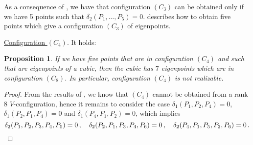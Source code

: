 \documentclass{amsart}
\theoremstyle{plain}
\newtheorem{prop}[lemma]{Proposition}
\theoremstyle{definition}
\begin{document}
As a consequence of , we have that configuration $(C_3)$ can
be obtained only if we have 5 points such that
$\delta_2(P_1, \dotsc, P_5) = 0$.  describes how to
obtain five points which give a configuration $(C_3)$ of eigenpoints.

\underline{Configuration $(C_4)$}. It holds:
\begin{prop}
\label{conf4no} If we have five points that are in
configuration $(C_4)$ and such that are eigenpoints of a cubic, then the
cubic has $7$ eigenpoints which are in configuration $(C_8)$. In particular,
configuration $(C_4)$ is not realizable.
\end{prop}
\begin{proof}
From the results of , we know that $(C_4)$
cannot be obtained from a rank 8 $V$-configuration,
hence it remains to consider the case $\delta_1(P_1, P_2, P_4) = 0$,
$\delta_1(P_2, P_1, P_4) = 0$ and $\delta_1(P_4, P_1, P_2) = 0$,
which implies
%
\[
  \delta_2(P_1, P_2, P_3, P_4, P_5) = 0 \,, \quad
  \delta_2(P_2, P_1, P_3, P_4, P_6) = 0 \,, \quad
  \delta_2(P_4, P_1, P_5, P_2, P_6) = 0 \,. \qedhere
\]
%
\end{proof}
\end{document}
